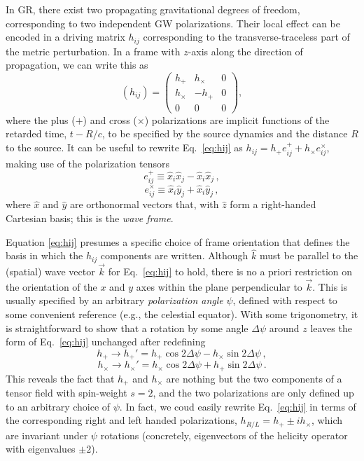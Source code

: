 \documentclass[aps,prd,twocolumn,superscriptaddress,preprintnumbers,floatfix,nofootinbib]{revtex4-2}
\newcommand{\beq}{\begin{equation}}
\newcommand{\eeq}{\end{equation}}
\newcommand*{\eq}[1]{Eq.~\eqref{eq:#1}}
\begin{document}
In GR, there exist two propagating gravitational degrees of freedom, corresponding to two independent GW polarizations.
Their local effect can be encoded in a driving matrix $h_{ij}$ corresponding to the transverse-traceless part of the metric perturbation.
In a frame with $z$-axis along the direction of propagation, we can write this as
\beq \label{eq:hij}
(h_{ij}) = \begin{pmatrix}
h_+ & h_\times  & 0 \\
h_\times  & - h_+ & 0  \\
0 & 0 & 0
\end{pmatrix} ,
\eeq
where the plus ($+$) and cross ($\times$) polarizations are implicit functions of the retarded time, $t - R/c$, to be specified by the source dynamics and the distance $R$ to the source.
It can be useful to rewrite \eq{hij} as $h_{ij} = h_+ e^+_{ij} + h_\times e^\times_{ij}$, making use of the polarization tensors
\beq
e^+_{ij} \equiv \hat{x}_i \hat{x}_j - \hat{x}_i \hat{x}_j \, ,
\eeq
\beq
e^\times_{ij} \equiv \hat{x}_i \hat{y}_j + \hat{x}_i \hat{y}_j\, ,
\eeq
where $\hat{x}$ and $\hat{y}$ are orthonormal vectors that, with $\hat{z}$ form a right-handed Cartesian basis; this is the \emph{wave frame}.

Equation \eqref{eq:hij} presumes a specific choice of frame orientation that defines the basis in which the $h_{ij}$ components are written.
Although $\hat{k}$ must be parallel to the (spatial) wave vector $\vec{k}$ for \eq{hij} to hold, there is no a priori restriction on the orientation of the $x$ and $y$ axes within the plane perpendicular to $\vec{k}$.
This is usually specified by an arbitrary \emph{polarization angle} $\psi$, defined with respect to some convenient reference (e.g., the celestial equator).
With some trigonometry, it is straightforward to show that a rotation by some angle $\Delta \psi$ around $z$ leaves the form of \eq{hij} unchanged after redefining
\beq \label{eq:htransf}
h_+ \rightarrow h_+' = h_+ \cos 2\Delta \psi - h_\times \sin 2\Delta\psi \, ,
\eeq
\beq
h_\times \rightarrow h_\times' = h_\times \cos 2\Delta \psi + h_+ \sin 2\Delta\psi \, .
\eeq
This reveals the fact that $h_+$ and $h_\times$ are nothing but the two components of a tensor field with spin-weight $s=2$, and the two polarizations are only defined up to an arbitrary choice of $\psi$.
In fact, we coud easily rewrite \eq{hij} in terms of the corresponding right and left handed polarizations, $h_{R/L} = h_+ \pm i h_\times$, which are invariant under $\psi$ rotations (concretely, eigenvectors of the helicity operator with eigenvalues $\pm 2$).
\end{document}
